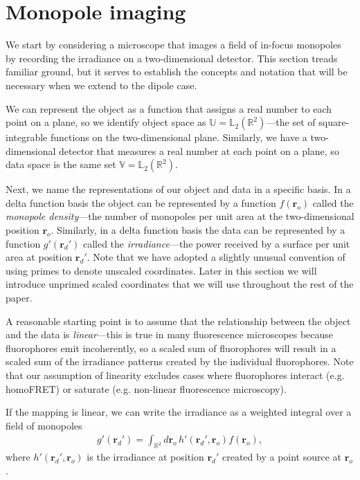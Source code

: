\documentclass[]{osa-article}
\providecommand{\ro}{\mathbf{\mathbf{r}}_o}
\providecommand{\rd}{\mathbf{r}_d}
\providecommand{\mbb}[1]{\mathbb{#1}}
\begin{document}
\section{Monopole imaging}\label{sec:monopole}
We start by considering a microscope that images a field of in-focus monopoles
by recording the irradiance on a two-dimensional detector. This section treads
familiar ground, but it serves to establish the concepts and notation that will
be necessary when we extend to the dipole case.

We can represent the object as a function that assigns a real number to each
point on a plane, so we identify object space as
$\mbb{U} = \mbb{L}_2(\mbb{R}^2)$---the set of square-integrable functions on the
two-dimensional plane. Similarly, we have a two-dimensional detector that
measures a real number at each point on a plane, so data space is the same set
$\mbb{V} = \mbb{L}_2(\mbb{R}^2)$.

Next, we name the representations of our object and data in a specific basis. In
a delta function basis the object can be represented by a function $f(\ro)$
called the \textit{monopole density}---the number of monopoles per unit area at
the two-dimensional position $\ro$. Similarly, in a delta function basis the
data can be represented by a function $g'(\rd')$ called the
\textit{irradiance}---the power received by a surface per unit area at position
$\rd'$. Note that we have adopted a slightly unusual convention of using primes
to denote unscaled coordinates. Later in this section we will introduce unprimed
scaled coordinates that we will use throughout the rest of the
paper.

A reasonable starting point is to assume that the relationship between the
object and the data is \textit{linear}---this is true in many fluorescence
microscopes because fluorophores emit incoherently, so a scaled sum of
fluorophores will result in a scaled sum of the irradiance patterns created by
the individual fluorophores. Note that our assumption of linearity excludes
cases where fluorophores interact (e.g. homoFRET) or saturate (e.g. non-linear
fluorescence microscopy).

If the mapping is linear, we can write the irradiance as a weighted integral
over a field of monopoles
\begin{align}
g'(\rd') = \int_{\mbb{R}^2}d\ro\, h'(\rd',\ro)f(\ro), \label{eq:fwdmono}
\end{align}
where $h'(\rd', \ro{})$ is the irradiance at position $\rd'$ created by a
point source at $\ro$.
\end{document}
